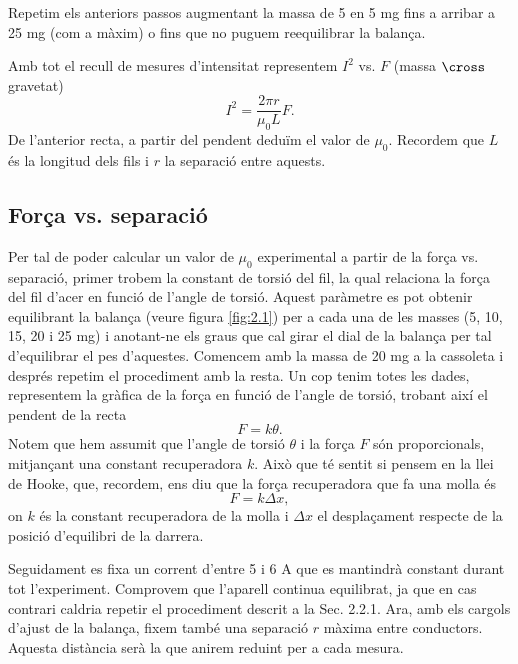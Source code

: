 \documentclass[a4paper,10.5pt]{report}
\begin{document}
Repetim els anteriors passos augmentant la massa de 5 en 5 mg fins a arribar a 25 mg (com a màxim) o fins que no puguem reequilibrar la balança.

Amb tot el recull de mesures d'intensitat representem $I^2$ vs. $F$ (massa $\cross$ gravetat)
\begin{equation}
	I^2 = \frac{2\pi r}{\mu_0 L} F. \label{eq:2.9}
\end{equation}
De l'anterior recta, a partir del pendent deduïm el valor de $\mu_0$. Recordem que $L$ és la longitud dels fils i $r$ la separació entre aquests.

\subsection{Força vs. separació}
Per tal de poder calcular un valor de $\mu_0$ experimental a partir de la força vs. separació, primer trobem la constant de torsió del fil, la qual relaciona la força del fil d'acer en funció de l'angle de torsió. Aquest paràmetre es pot obtenir equilibrant la balança (veure figura \ref{fig:2.1}) per a cada una de les masses (5, 10, 15, 20 i 25 mg) i anotant-ne els graus que cal girar el dial de la balança per tal d'equilibrar el pes d'aquestes. Comencem amb la massa de 20 mg a la cassoleta i després repetim el procediment amb la resta. Un cop tenim totes les dades, representem la gràfica de la força en funció de l'angle de torsió, trobant així el pendent de la recta 
\begin{equation}
	F=k\theta.
	\label{eq2:10}
\end{equation}
Notem que hem assumit que l'angle de torsió $\theta$ i la força $F$ són proporcionals, mitjançant una constant recuperadora $k$. Això que té sentit si pensem en la llei de Hooke, que, recordem, ens diu que la força recuperadora que fa una molla és
\begin{equation}
	F = k\Delta x,
\end{equation} 
on $k$ és la constant recuperadora de la molla i $\Delta x$ el desplaçament respecte de la posició d'equilibri de la darrera.

Seguidament es fixa un corrent d'entre 5 i 6 A que es mantindrà constant durant tot l'experiment. Comprovem que l'aparell continua equilibrat, ja que en cas contrari caldria repetir el procediment descrit a la Sec. 2.2.1. Ara, amb els cargols d'ajust de la balança, fixem també una separació $r$ màxima entre conductors. Aquesta distància serà la que anirem reduint per a cada mesura.
\end{document}
